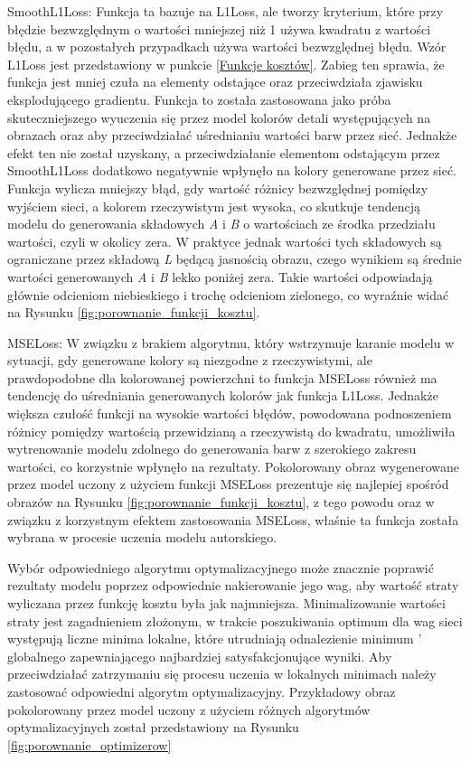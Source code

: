   \noindent
  SmoothL1Loss: Funkcja ta bazuje na L1Loss, ale tworzy kryterium, które przy
  błędzie bezwzględnym o wartości mniejszej niż 1 używa kwadratu z wartości
  błędu, a w pozostałych przypadkach używa wartości bezwzględnej błędu. Wzór
  L1Loss jest przedstawiony w punkcie \ref{Funkcje kosztów}. Zabieg ten sprawia,
  że funkcja jest mniej czuła na elementy odstające oraz przeciwdziała zjawisku
  eksplodującego gradientu. Funkcja to została zastosowana jako próba skuteczniejszego
  wyuczenia się przez model kolorów detali występujących na obrazach oraz aby przeciwdziałać
  uśrednianiu wartości barw przez sieć. Jednakże efekt ten nie został uzyskany,
  a przeciwdziałanie elementom odstającym przez SmoothL1Loss dodatkowo negatywnie wpłynęło na
  kolory generowane przez sieć. Funkcja wylicza mniejszy błąd, gdy
  wartość różnicy bezwzględnej pomiędzy wyjściem sieci, a kolorem
  rzeczywistym jest wysoka, co skutkuje tendencją modelu do
  generowania składowych \textit{A} i \textit{B} o wartościach ze środka
  przedziału wartości, czyli w okolicy zera. W praktyce jednak wartości tych
  składowych są ograniczane przez składową \textit{L} będącą jasnością obrazu,
  czego wynikiem są średnie wartości generowanych \textit{A} i \textit{B} lekko poniżej zera.
  Takie wartości odpowiadają głównie odcieniom niebieskiego i trochę odcieniom
  zielonego, co wyraźnie widać na Rysunku \ref{fig:porownanie_funkcji_kosztu}.

  \noindent
  MSELoss: W związku z brakiem algorytmu, który wstrzymuje karanie modelu w
  sytuacji, gdy generowane kolory są niezgodne z rzeczywistymi, ale prawdopodobne
  dla kolorowanej powierzchni to funkcja MSELoss również ma tendencję do
  uśredniania generowanych kolorów jak funkcja L1Loss. Jednakże większa czułość funkcji
  na wysokie wartości błędów, powodowana podnoszeniem różnicy pomiędzy wartością
  przewidzianą a rzeczywistą do kwadratu,
  umożliwiła wytrenowanie modelu zdolnego do generowania
  barw z szerokiego zakresu wartości, co korzystnie wpłynęło na rezultaty.
  Pokolorowany obraz wygenerowane przez model uczony z użyciem funkcji MSELoss prezentuje
  się najlepiej spośród obrazów na Rysunku \ref{fig:porownanie_funkcji_kosztu},
  z tego powodu oraz w związku z korzystnym efektem zastosowania MSELoss, właśnie
  ta funkcja została wybrana w procesie uczenia modelu autorskiego.

  Wybór odpowiedniego algorytmu optymalizacyjnego może znacznie poprawić rezultaty
  modelu poprzez odpowiednie nakierowanie jego wag, aby wartość straty wyliczana
  przez funkcję kosztu była jak najmniejsza. Minimalizowanie wartości straty
  jest zagadnieniem złożonym, w trakcie poszukiwania optimum dla wag sieci
  występują liczne minima lokalne, które utrudniają odnalezienie minimum '
  globalnego zapewniającego najbardziej satysfakcjonujące wyniki. Aby
  przeciwdziałać zatrzymaniu się procesu uczenia w lokalnych minimach należy
  zastosować odpowiedni algorytm optymalizacyjny. Przykładowy obraz pokolorowany
  przez model uczony z użyciem różnych algorytmów optymalizacyjnych został
  przedstawiony na Rysunku \ref{fig:porownanie_optimizerow}

